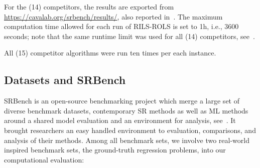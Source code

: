 \documentclass[a4paper,12pt]{elsarticle}
\begin{document}
For the (14) competitors, the results are exported from \url{https://cavalab.org/srbench/results/}, also reported in~\cite{la2021contemporary}. 
The maximum computation time allowed for each run of \textsc{RILS}-\textsc{ROLS} is set to 1h, i.e., 3600 seconds; note that the same runtime limit was used for all (14) competitors, see~\cite{la2021contemporary}. 


All (15) competitor algorithms were run ten times per each instance.  


\subsection{Datasets and SRBench}

SRBench is an open-source benchmarking project which merge a large set of diverse benchmark datasets, contemporary SR methods as well as ML methods around a shared model evaluation and an environment for analysis, see~\cite{la2021contemporary}. It brought researchers an easy handled environment to evaluation, comparisons, and analysis of their methods. Among all benchmark sets, we involve two real-world inspired benchmark sets, the ground-truth regression problems, into our computational evaluation: 
\end{document}
